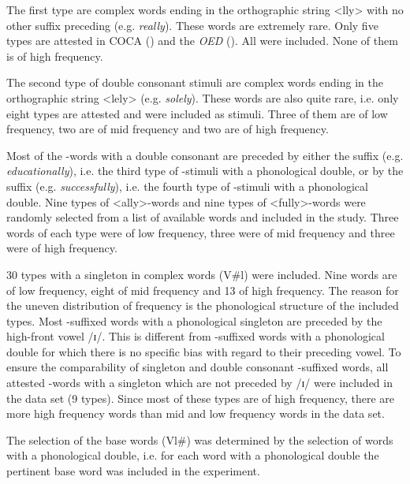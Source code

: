 The first type are complex words ending in the orthographic string <lly> with no other suffix preceding  (e.g. \textit{really}). These words are extremely rare. Only five types are attested  in COCA (\citealt{Davies.20082014}) and the \textit{OED} (\citealt{OED.2013}). All were included. None of them is of high frequency.

The second type of double consonant stimuli are complex words ending in the orthographic string <lely> (e.g. \textit{solely}). These words are also quite rare, i.e. only eight  types are attested and were included as stimuli. Three of them  are of low frequency, two are of mid frequency and two are of high frequency.



Most of the -words with a double consonant are preceded by either the suffix  (e.g. \textit{educationally}), i.e. the third type of -stimuli with a phonological double, or by the suffix  (e.g. \textit{successfully}), i.e. the fourth type of -stimuli with a phonological double. Nine types of <ally>-words and nine types of <fully>-words were randomly selected from a list of available words and included in the study. Three words of each type were of low frequency, three were of mid frequency and three were of high frequency.



30 types with a singleton in complex words (V\#l) were included. Nine words are of low frequency, eight of mid frequency and 13 of high frequency. The reason for the uneven distribution of frequency is the phonological structure of the included types. Most -suffixed words with a phonological singleton are preceded by the high-front vowel /ɪ/. This is different from -suffixed words with a phonological double for which there is no specific bias with regard to their preceding vowel. To ensure the comparability of singleton and double consonant -suffixed words, all attested -words with a singleton which are not preceded by /ɪ/ were included in the data set (9 types). Since most of these types are of high frequency, there are more high frequency words than mid and low frequency words in the data set. %






The selection of the base words (Vl\#) was determined by the selection of words with a phonological double, i.e.  for each word with a phonological double the pertinent base word was included in the experiment. 

